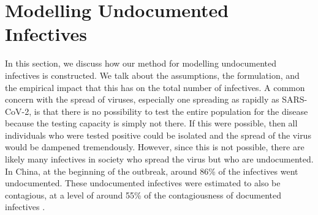 \documentclass[12pt]{article}
\begin{document}
	
	\section{Modelling Undocumented Infectives} \label{sec:undocumented_modelling}
	In this section, we discuss how our method for modelling undocumented infectives is constructed. We talk about the assumptions, the formulation, and the empirical impact that this has on the total number of infectives. A common concern with the spread of viruses, especially one spreading as rapidly as SARS-CoV-2, is that there is no possibility to test the entire population for the disease because the testing capacity is simply not there. If this were possible, then all individuals who were tested positive could be isolated and the spread of the virus would be dampened tremendously. However, since this is not possible, there are likely many infectives in society who spread the virus but who are undocumented. In China, at the beginning of the outbreak, around 86\% of the infectives went undocumented. These undocumented infectives were estimated to also be contagious, at a level of around 55\% of the contagiousness of documented infectives \parencite{li2020undocumented}. \\
	
\end{document}
